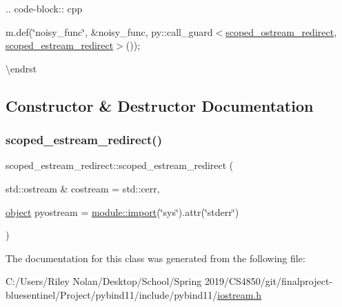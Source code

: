 .. code-\/block\+:: cpp

m.\+def(\char`\"{}noisy\+\_\+func\char`\"{}, \&noisy\+\_\+func, py\+::call\+\_\+guard$<$\mbox{\hyperlink{classscoped__ostream__redirect}{scoped\+\_\+ostream\+\_\+redirect}}, \mbox{\hyperlink{classscoped__estream__redirect}{scoped\+\_\+estream\+\_\+redirect}}$>$());

\textbackslash{}endrst 

\subsection{Constructor \& Destructor Documentation}
\mbox{\label{classscoped__estream__redirect_a85d52a127c735fd9d4abc8f3748081bd}} 
\subsubsection{\texorpdfstring{scoped\_estream\_redirect()}{scoped\_estream\_redirect()}}
{\footnotesize\ttfamily scoped\+\_\+estream\+\_\+redirect\+::scoped\+\_\+estream\+\_\+redirect (\begin{DoxyParamCaption}\item[{std\+::ostream \&}]{costream = {\ttfamily std\+:\+:cerr},  }\item[{\mbox{\hyperlink{classobject}{object}}}]{pyostream = {\ttfamily \mbox{\hyperlink{classmodule_a40817edef0ded5727701534bcded9982}{module\+::import}}(\char`\"{}sys\char`\"{}).attr(\char`\"{}stderr\char`\"{})} }\end{DoxyParamCaption})\hspace{0.3cm}{\ttfamily [inline]}}



The documentation for this class was generated from the following file\+:\begin{DoxyCompactItemize}
\item 
C\+:/\+Users/\+Riley Nolan/\+Desktop/\+School/\+Spring 2019/\+C\+S4850/git/finalproject-\/bluesentinel/\+Project/pybind11/include/pybind11/\mbox{\hyperlink{iostream_8h}{iostream.\+h}}\end{DoxyCompactItemize}
